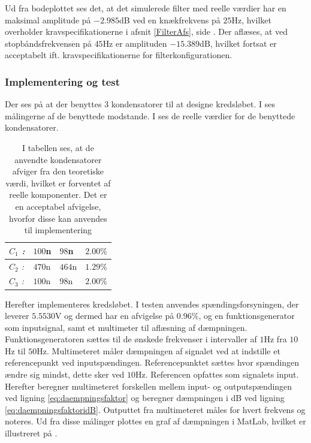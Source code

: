 \noindent Ud fra bodeplottet ses det, at det simulerede filter med reelle værdier har en maksimal amplitude på $-2.985$dB ved en knækfrekvens på $25$Hz, hvilket overholder kravspecifikationerne i afsnit \ref{FilterAfs}, side \pageref{FilterAfs}. Der aflæses, at ved stopbåndsfrekvensen på $45$Hz er amplituden $-15.389$dB, hvilket fortsat er acceptabelt ift. kravspecifikationerne for filterkonfigurationen. 

\subsubsection{Implementering og test} 
Der ses på  at der benyttes 3 kondensatorer til at designe kredsløbet. I  ses målingerne af de benyttede modstande. I  ses de reelle værdier for de benyttede kondensatorer.
\begin{table}[H]
	\centering
	\begin{tabular}{|l|l|l|l|}
		\hline
		\textit{$C_{1}$ :}                            & $100$n             & $98$n              & $2.00\%$           \\ \hline
		\textit{$C_{2}$ :}                            & $470$n             & $464$n             & $1.29\%$           \\ \hline 
		\textit{$C_{3}$ :}                            & $100$n             & $98$n              & $2.00\%$           \\ \hline
	\end{tabular}
	\caption{I tabellen ses, at de anvendte kondensatorer afviger fra den teoretiske værdi, hvilket er forventet af reelle komponenter. Det er en acceptabel afvigelse, hvorfor disse kan anvendes til implementering}
	\label{Tab:Maalingfilter}
\end{table}
\noindent Herefter implementeres kredsløbet. I testen anvendes spændingsforsyningen, der leverer $5.5530$V og dermed har en afvigelse på 0.96\%, og en funktionsgenerator som inputsignal, samt et multimeter til aflæsning af dæmpningen. Funktionsgeneratoren sættes til de ønskede frekvenser i intervaller af $1$Hz fra $10$Hz til $50$Hz. Multimeteret måler dæmpningen af signalet ved at indstille et referencepunkt ved inputspændingen. Referencepunktet sættes hvor spændingen ændre sig mindst, dette sker ved $10$Hz. Referencen opfattes som signalets input. Herefter beregner multimeteret forskellen mellem input- og outputspændingen ved ligning \ref{eq:daempningsfaktor} og beregner dæmpningen i dB ved ligning \ref{eq:daempningsfaktoridB}. Outputtet fra multimeteret måles for hvert frekvens og noteres. Ud fra disse målinger plottes en graf af dæmpningen i MatLab, hvilket er illustreret på .  

